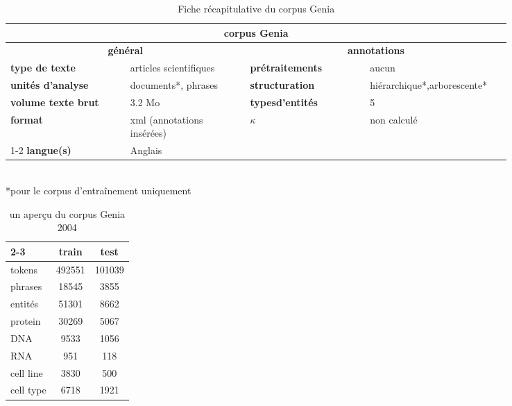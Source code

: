 \documentclass[12pt,a4paper,times,twoside,openright]{report}
\begin{document}
\begin{table}[ht!]
\centering
\begin{tabular}{|p{0.21\linewidth}|p{0.21\linewidth}|p{0.21\linewidth}|p{0.21\linewidth}|}
\hline
\multicolumn{4}{|c|}{\textbf{corpus Genia}} \\
\hline
\multicolumn{2}{|c|}{\textbf{général}} & \multicolumn{2}{c|}{\textbf{annotations}} \\
\hline
\textbf{type de texte} & articles scientifiques & \textbf{prétraitements} & aucun \\
\hline
\textbf{unités d'analyse} & documents*, phrases & \textbf{structuration} & hiérarchique*,\newline arborescente* \\
\hline
\textbf{volume texte brut} & 3.2 Mo & \textbf{types\newline d'entités} & 5 \\
\hline
\textbf{format} & xml (annotations insérées) & \multirow{2}{*}{\textbf{$\kappa$}} & \multirow{2}{*}{non calculé} \\
\cline{1-2}
\textbf{langue(s)} & Anglais & & \\
\hline
\end{tabular}
\scriptsize{\\ *pour le corpus d'entraînement uniquement}
\caption{Fiche récapitulative du corpus Genia}
\label{tab:genia-recap-card}
\end{table}

\begin{table}[ht!]
\centering
\begin{tabular}{|l|cc|}
\cline{2-3}
\multicolumn{1}{l|}{} & train  & test \\
\hline
tokens                & 492551 & 101039 \\
phrases               & 18545  & 3855 \\
entités               & 51301  & 8662 \\
\hline
protein               & 30269  & 5067 \\
DNA                   & 9533   & 1056 \\
RNA                   & 951    & 118 \\
cell line             & 3830   & 500 \\
cell type             & 6718   & 1921 \\
\hline
\end{tabular}
\caption{un aperçu du corpus Genia 2004}
\label{tab:genia-2004-numbers}
\end{table}
\end{document}

